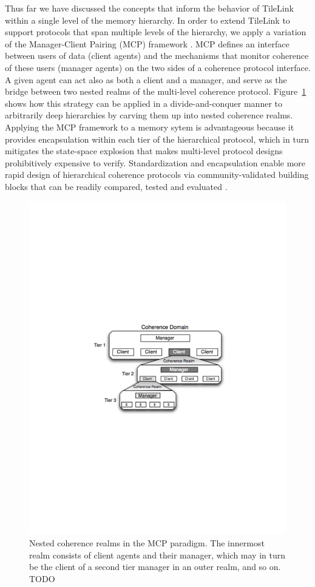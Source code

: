 Thus far we have discussed the concepts that inform the behavior of TileLink within a single level of the memory hierarchy.
In order to extend TileLink to support protocols that span multiple levels of the hierarchy, we apply a variation of the Manager-Client Pairing (MCP) framework \cite{beu2011manager}.
MCP defines an interface between users of data (client agents) and the mechanisms that monitor coherence of these users (manager agents) on the two sides of a coherence protocol interface.
A given agent can act also as both a client and a manager, and serve as the bridge between two nested realms of the multi-level coherence protocol.
Figure~\ref{fig:mcp} shows how this strategy can be applied in a divide-and-conquer manner to arbitrarily deep hierarchies
by carving them up into nested coherence realms.
Applying the MCP framework to a memory sytem is advantageous because it provides
encapsulation within each tier of the hierarchical protocol,
which in turn mitigates the state-space explosion
that makes multi-level protocol designs prohibitively expensive to verify.
Standardization and encapsulation enable more rapid
design of hierarchical coherence protocols via community-validated
building blocks that can be readily compared, tested and evaluated \cite{beu2011manager}.

\begin{figure}[]
\centering
\includegraphics[width=1\columnwidth]{tilelink/figures/mcp-realm.pdf}
\caption[Nested coherence realms in the MCP paradigm.]{
Nested coherence realms in the MCP paradigm. 
The innermost realm consists of client agents and their manager, which may in
turn be the client of a second tier manager in an outer realm, and so on.
TODO }
\label{fig:mcp}
\end{figure}

